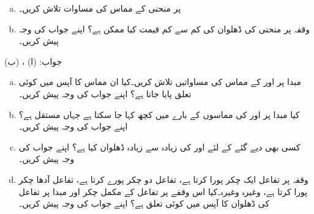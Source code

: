 \begin{enumerate}[a.]

\item
{} پر منحنی  کے مماس کی مساوات تلاش کریں۔
\item
وقفہ  پر منحنی کی ڈھلوان کی کم سے کم قیمت کیا ممکن ہے؟ اپنے جواب کی وجہ پیش کریں۔
\end{enumerate}
جواب:\quad
(ا) ، (ب) 
\begin{enumerate}[a.]

\item
مبدا پر  اور  کے مماس کی مساواتیں تلاش کریں۔کیا ان مماس کا آپس میں کوئی تعلق پایا جاتا ہے؟ اپنے جواب کی وجہ پیش کریں۔
\item
کیا مبدا پر  اور  کی مماسوں کے بارے میں کچھ کہا جا سکتا ہے جہاں مستقل  ہے؟ اپنے جواب کی وجہ پیش کریں۔
\item
کسی بھی دیے گئے  کے لئے  اور  کی زیادہ سے زیادہ ڈھلوان کیا ہے؟ اپنے جواب کی وجہ پیش کریں۔
\item
وقفہ  پر تفاعل  ایک  چکر پورا کرتا ہے، تفاعل  دو چکر پورے کرتا ہے، تفاعل  آدھا چکر پورا کرتا ہے، وغیرہ وغیرہ۔کیا اس وقفے پر تفاعل  کے مکمل چکر اور مبدا پر تفاعل کی ڈھلوان کا آپس میں کوئی تعلق ہے؟ اپنے جواب کی وجہ پیش کریں۔ 
\end{enumerate}

